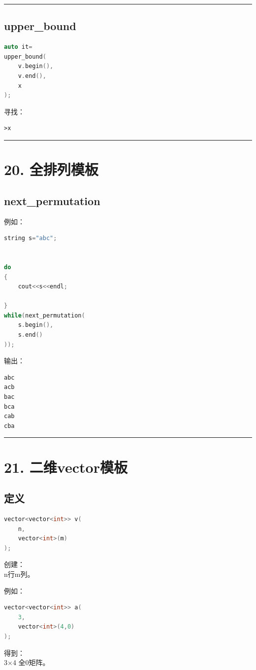 \documentclass[9pt,twocolumn]{extarticle}
\begin{document}
\noindent\rule{\linewidth}{0.4pt}

\subsection{upper\_bound}
\begin{lstlisting}[language=C++]
auto it=
upper_bound(
    v.begin(),
    v.end(),
    x
);
\end{lstlisting}
寻找：
\begin{lstlisting}
>x
\end{lstlisting}

\noindent\rule{\linewidth}{0.4pt}

\section{20. 全排列模板}

\subsection{next\_permutation}
例如：
\begin{lstlisting}[language=C++]
string s="abc";


do
{
    cout<<s<<endl;

}
while(next_permutation(
    s.begin(),
    s.end()
));
\end{lstlisting}
输出：
\begin{lstlisting}
abc
acb
bac
bca
cab
cba
\end{lstlisting}

\noindent\rule{\linewidth}{0.4pt}

\section{21. 二维vector模板}

\subsection{定义}
\begin{lstlisting}[language=C++]
vector<vector<int>> v(
    n,
    vector<int>(m)
);
\end{lstlisting}
创建：\\
n行m列。

例如：
\begin{lstlisting}[language=C++]
vector<vector<int>> a(
    3,
    vector<int>(4,0)
);
\end{lstlisting}
得到：\\
3×4 全0矩阵。
\end{document}
